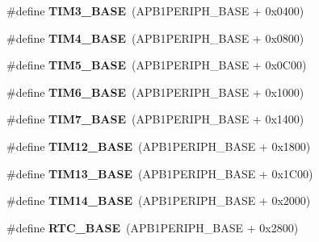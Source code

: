 \begin{DoxyCompactItemize}
\#define {\bfseries T\+I\+M3\+\_\+\+B\+A\+SE}~(A\+P\+B1\+P\+E\+R\+I\+P\+H\+\_\+\+B\+A\+SE + 0x0400)
\item 
\mbox{\label{group___peripheral__memory__map_ga56e2d44b0002f316527b8913866a370d}} 
\#define {\bfseries T\+I\+M4\+\_\+\+B\+A\+SE}~(A\+P\+B1\+P\+E\+R\+I\+P\+H\+\_\+\+B\+A\+SE + 0x0800)
\item 
\mbox{\label{group___peripheral__memory__map_ga3e1671477190d065ba7c944558336d7e}} 
\#define {\bfseries T\+I\+M5\+\_\+\+B\+A\+SE}~(A\+P\+B1\+P\+E\+R\+I\+P\+H\+\_\+\+B\+A\+SE + 0x0\+C00)
\item 
\mbox{\label{group___peripheral__memory__map_ga8268ec947929f192559f28c6bf7d1eac}} 
\#define {\bfseries T\+I\+M6\+\_\+\+B\+A\+SE}~(A\+P\+B1\+P\+E\+R\+I\+P\+H\+\_\+\+B\+A\+SE + 0x1000)
\item 
\mbox{\label{group___peripheral__memory__map_ga0ebf54364c6a2be6eb19ded6b18b6387}} 
\#define {\bfseries T\+I\+M7\+\_\+\+B\+A\+SE}~(A\+P\+B1\+P\+E\+R\+I\+P\+H\+\_\+\+B\+A\+SE + 0x1400)
\item 
\mbox{\label{group___peripheral__memory__map_ga33dea32fadbaecea161c2ef7927992fd}} 
\#define {\bfseries T\+I\+M12\+\_\+\+B\+A\+SE}~(A\+P\+B1\+P\+E\+R\+I\+P\+H\+\_\+\+B\+A\+SE + 0x1800)
\item 
\mbox{\label{group___peripheral__memory__map_gad20f79948e9359125a40bbf6ed063590}} 
\#define {\bfseries T\+I\+M13\+\_\+\+B\+A\+SE}~(A\+P\+B1\+P\+E\+R\+I\+P\+H\+\_\+\+B\+A\+SE + 0x1\+C00)
\item 
\mbox{\label{group___peripheral__memory__map_ga862855347d6e1d92730dfe17ee8e90b8}} 
\#define {\bfseries T\+I\+M14\+\_\+\+B\+A\+SE}~(A\+P\+B1\+P\+E\+R\+I\+P\+H\+\_\+\+B\+A\+SE + 0x2000)
\item 
\mbox{\label{group___peripheral__memory__map_ga4265e665d56225412e57a61d87417022}} 
\#define {\bfseries R\+T\+C\+\_\+\+B\+A\+SE}~(A\+P\+B1\+P\+E\+R\+I\+P\+H\+\_\+\+B\+A\+SE + 0x2800)
\item 

\end{DoxyCompactItemize}
